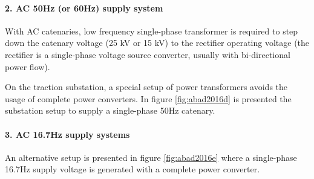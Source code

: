\paragraph{2. AC 50Hz (or 60Hz) supply system\\}

With AC catenaries, low frequency single-phase transformer is required to step down the catenary voltage (25 kV or 15 kV) to the rectifier operating voltage (the rectifier is a single-phase voltage source converter, usually with bi-directional power flow).

On the traction substation, a special setup of power transformers avoids the usage of complete power converters. In figure \ref{fig:abad2016d} is presented the substation setup to supply a single-phase 50Hz catenary.

\paragraph{3. AC 16.7Hz supply systems\\}
An alternative setup is presented in figure \ref{fig:abad2016e} where a single-phase 16.7Hz supply voltage is generated with a complete power converter. 



